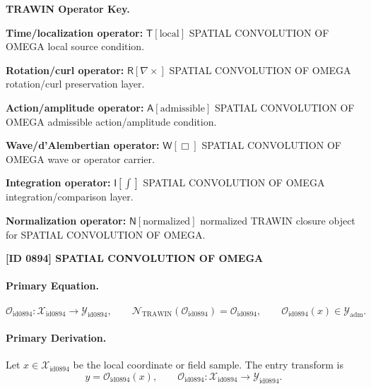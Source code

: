 \par\vspace{0.45\baselineskip}
\noindent\begin{minipage}[t]{\linewidth}
\begingroup
\small
\raggedright
\textbf{TRAWIN Operator Key.}\par
\noindent\textbf{Time/localization operator:} $\mathsf{T}\!\left[\mathrm{local}\right]$ SPATIAL CONVOLUTION OF OMEGA local source condition.\par
\noindent\textbf{Rotation/curl operator:} $\mathsf{R}\!\left[\nabla\times\right]$ SPATIAL CONVOLUTION OF OMEGA rotation/curl preservation layer.\par
\noindent\textbf{Action/amplitude operator:} $\mathsf{A}\!\left[\mathrm{admissible}\right]$ SPATIAL CONVOLUTION OF OMEGA admissible action/amplitude condition.\par
\noindent\textbf{Wave/d'Alembertian operator:} $\mathsf{W}\!\left[\Box\right]$ SPATIAL CONVOLUTION OF OMEGA wave or operator carrier.\par
\noindent\textbf{Integration operator:} $\mathsf{I}\!\left[\int\right]$ SPATIAL CONVOLUTION OF OMEGA integration/comparison layer.\par
\noindent\textbf{Normalization operator:} $\mathsf{N}\!\left[\mathrm{normalized}\right]$ normalized TRAWIN closure object for SPATIAL CONVOLUTION OF OMEGA.\par
\endgroup
\end{minipage}

\clearpage
\noindent\textbf{[ID 0894] SPATIAL CONVOLUTION OF OMEGA}\par
\vspace{0.35em}
\paragraph{Primary Equation.}
\[
\mathcal{O}_{\mathrm{id0894}}:\mathcal{X}_{\mathrm{id0894}}\longrightarrow \mathcal{Y}_{\mathrm{id0894}},\qquad
\mathcal{N}_{\mathrm{TRAWIN}}(\mathcal{O}_{\mathrm{id0894}})=\mathcal{O}_{\mathrm{id0894}},\qquad
\mathcal{O}_{\mathrm{id0894}}(x)\in\mathcal{Y}_{\mathrm{adm}}.
\]

\paragraph{Primary Derivation.} Let $x\in \mathcal{X}_{\mathrm{id0894}}$ be the local coordinate or field sample.  The entry transform is\[
y=\mathcal{O}_{\mathrm{id0894}}(x),\qquad \mathcal{O}_{\mathrm{id0894}}:\mathcal{X}_{\mathrm{id0894}}\longrightarrow \mathcal{Y}_{\mathrm{id0894}}.
\]

